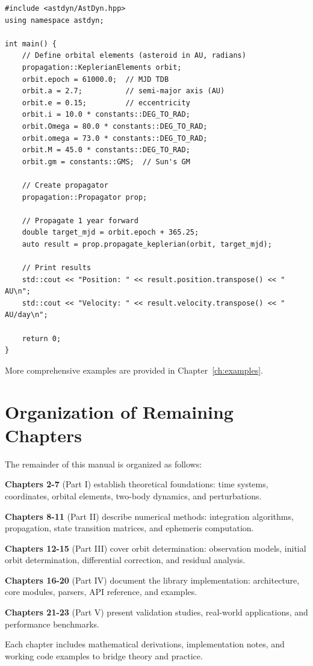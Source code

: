 \begin{lstlisting}[style=cpp,caption={Basic orbit propagation}]
#include <astdyn/AstDyn.hpp>
using namespace astdyn;

int main() {
    // Define orbital elements (asteroid in AU, radians)
    propagation::KeplerianElements orbit;
    orbit.epoch = 61000.0;  // MJD TDB
    orbit.a = 2.7;          // semi-major axis (AU)
    orbit.e = 0.15;         // eccentricity
    orbit.i = 10.0 * constants::DEG_TO_RAD;
    orbit.Omega = 80.0 * constants::DEG_TO_RAD;
    orbit.omega = 73.0 * constants::DEG_TO_RAD;
    orbit.M = 45.0 * constants::DEG_TO_RAD;
    orbit.gm = constants::GMS;  // Sun's GM
    
    // Create propagator
    propagation::Propagator prop;
    
    // Propagate 1 year forward
    double target_mjd = orbit.epoch + 365.25;
    auto result = prop.propagate_keplerian(orbit, target_mjd);
    
    // Print results
    std::cout << "Position: " << result.position.transpose() << " AU\n";
    std::cout << "Velocity: " << result.velocity.transpose() << " AU/day\n";
    
    return 0;
}
\end{lstlisting}

More comprehensive examples are provided in Chapter~\ref{ch:examples}.

\section{Organization of Remaining Chapters}

The remainder of this manual is organized as follows:

\textbf{Chapters 2-7} (Part I) establish theoretical foundations: time systems, coordinates, orbital elements, two-body dynamics, and perturbations.

\textbf{Chapters 8-11} (Part II) describe numerical methods: integration algorithms, propagation, state transition matrices, and ephemeris computation.

\textbf{Chapters 12-15} (Part III) cover orbit determination: observation models, initial orbit determination, differential correction, and residual analysis.

\textbf{Chapters 16-20} (Part IV) document the library implementation: architecture, core modules, parsers, API reference, and examples.

\textbf{Chapters 21-23} (Part V) present validation studies, real-world applications, and performance benchmarks.

Each chapter includes mathematical derivations, implementation notes, and working code examples to bridge theory and practice.
